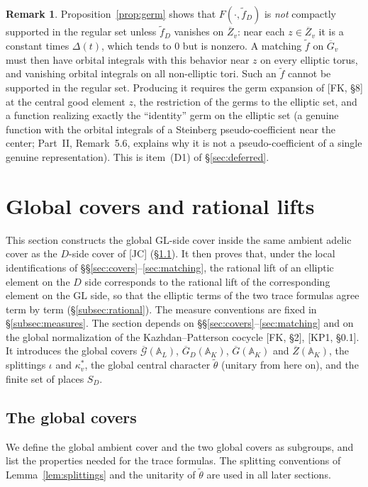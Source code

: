\documentclass[12pt]{article}
\newcommand{\ov}[1]{\overline{#1}}
\newcommand{\A}{\mathbb{A}}
\newcommand{\GL}{\mathrm{GL}}
\newcommand{\Gb}{\ov{G}}
\newcommand{\Zb}{\ov{Z}}
\newcommand{\GDb}{\ov{G}_D}
\newcommand{\ks}{\kappa^{*}}
\newcommand{\cGb}{\ov{\mathcal{G}}}
\theoremstyle{plain}
\theoremstyle{definition}
\newtheorem{remark}[theorem]{Remark}
\begin{document}
\begin{remark}
Proposition~\ref{prop:germ} shows that $F(\cdot,\tilde f_D)$ is \emph{not} compactly supported in the regular set unless $\tilde f_D$ vanishes on $\Zb_v$: near each $z\in\Zb_v$ it is a constant times $\Delta(t)$, which tends to $0$ but is nonzero. A matching $\tilde f$ on $\Gb_v$ must then have orbital integrals with this behavior near $z$ on every elliptic torus, and vanishing orbital integrals on all non-elliptic tori. Such an $\tilde f$ cannot be supported in the regular set. Producing it requires the germ expansion of [FK, \S8] at the central good element $z$, the restriction of the germs to the elliptic set, and a function realizing exactly the ``identity'' germ on the elliptic set (a genuine function with the orbital integrals of a Steinberg pseudo-coefficient near the center; Part~II, Remark~5.6, explains why it is not a pseudo-coefficient of a single genuine representation). This is item~(D1) of \S\ref{sec:deferred}.
\end{remark}


\section{Global covers and rational lifts}\label{sec:global}
This section constructs the global $\GL$-side cover inside the same ambient adelic cover as the $D$-side cover of [JC] (\S\ref{subsec:globalcovers}). It then proves that, under the local identifications of \S\S\ref{sec:covers}--\ref{sec:matching}, the rational lift of an elliptic element on the $D$ side corresponds to the rational lift of the corresponding element on the $\GL$ side, so that the elliptic terms of the two trace formulas agree term by term (\S\ref{subsec:rational}). The measure conventions are fixed in \S\ref{subsec:measures}. The section depends on \S\S\ref{sec:covers}--\ref{sec:matching} and on the global normalization of the Kazhdan--Patterson cocycle [FK, \S2], [KP1, \S0.1]. It introduces the global covers $\cGb(\A_L)$, $\GDb(\A_K)$, $\Gb(\A_K)$ and $\Zb(\A_K)$, the splittings $\iota$ and $\ks_v$, the global central character $\tilde\theta$ (unitary from here on), and the finite set of places $S_D$.

\subsection{The global covers}\label{subsec:globalcovers}
We define the global ambient cover and the two global covers as subgroups, and list the properties needed for the trace formulas. The splitting conventions of Lemma~\ref{lem:splittings} and the unitarity of $\tilde\theta$ are used in all later sections.
\end{document}
